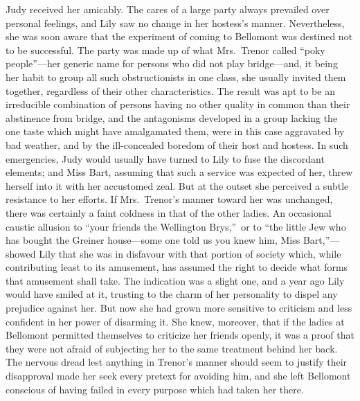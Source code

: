 \documentclass[12pt,a4paper]{book}
\begin{document}
Judy received her amicably. The cares of a large party always
prevailed over personal feelings, and Lily saw no change in her
hostess's manner. Nevertheless, she was soon aware that the
experiment of coming to Bellomont was destined not to be
successful. The party was made up of what Mrs.\ Trenor called
``poky people''---her generic name for persons who did not play
bridge---and, it being her habit to group all such obstructionists
in one class, she usually invited them together, regardless of
their other characteristics. The result was apt to be an
irreducible combination of persons having no other quality in
common than their abstinence from bridge, and the antagonisms
developed in a group lacking the one taste which might have
amalgamated them, were in this case aggravated by bad weather,
and by the ill-concealed boredom of their host and hostess. In
such emergencies, Judy would usually have turned to Lily to fuse
the discordant elements; and Miss Bart, assuming that such a
service was expected of her, threw herself into it with her
accustomed zeal. But at the outset she perceived a subtle
resistance to her efforts. If Mrs.\ Trenor's manner toward her was
unchanged, there was certainly a faint coldness in that of the
other ladies. An occasional caustic allusion to ``your friends the
Wellington Brys,''\ or to ``the little Jew who has bought the
Greiner house---some one told us you knew him, Miss Bart,''---showed
Lily that she was in disfavour with that portion of society
which, while contributing least to its amusement, has assumed the
right to decide what forms that amusement shall take. The
indication was a slight one, and a year ago Lily would have
smiled at it, trusting to the charm of her personality to dispel
any prejudice against her. But now she had grown more sensitive
to criticism and less confident in her power of disarming it. She
knew, moreover, that if the ladies at Bellomont permitted
themselves to criticize her friends openly, it was a proof that
they were not afraid of subjecting her to the same treatment
behind her back. The nervous dread lest anything in Trenor's
manner should seem to justify their disapproval made her seek
every pretext for avoiding him, and she left Bellomont conscious
of having failed in every purpose which had taken her
there.
\end{document}

